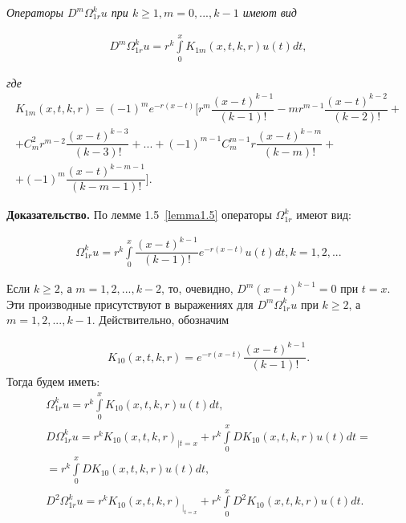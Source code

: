 \textit{Операторы $ D^m\Omega_{1r}^ku $ при $ k \geq 1, m = 0,...,k-1 $ имеют вид}

\begin{equation}
\begin{array}{c}

D^m\Omega_{1r}^ku = r^k\int\limits_0^x K_{1m}(x,t,k,r)u(t)dt,

\end{array}
\end{equation}

\textit{где}
\begin{equation}
\begin{array}{c}

K_{1m}(x,t,k,r) = (-1)^me^{-r(x-t)} \biggl[r^m\dfrac{(x-t)^{k-1}}{(k-1)!} - mr^{m-1}\dfrac{(x-t)^{k-2}}{(k-2)!} + \\ + C_m^2r^{m-2}\dfrac{(x-t)^{k-3}}{(k-3)!} + ... + (-1)^{m-1}C_m^{m-1}r\dfrac{(x-t)^{k-m}}{(k-m)!} + \\ 
+ (-1)^m\dfrac{(x-t)^{k-m-1}}{(k-m-1)!}\biggr].

\end{array}
\end{equation}

\textbf{Доказательство.} По лемме 1.5~\eqref{lemma1.5} операторы $ \Omega_{1r}^k $ имеют вид:

\begin{equation}
\begin{array}{c}
\nonumber

\Omega_{1r}^ku = r^k \int\limits_0^x \dfrac{(x-t)^{k-1}}{(k-1)!}e^{-r(x-t)}u(t)dt, k = 1,2,...

\end{array}
\end{equation}

Если $ k \geq 2 $, а $ m = 1,2,...,k-2 $, то, очевидно, $ D^m(x-t)^{k-1} = 0 $ при $ t = x $. Эти производные присутствуют в выражениях для $ D^m\Omega_{1r}^ku $ при $ k \geq 2 $, а $ m = 1,2,...,k-1 $. Действительно, обозначим

\begin{equation}
\begin{array}{c}

K_{10}(x,t,k,r) = e^{-r(x-t)}\dfrac{(x-t)^{k-1}}{(k-1)!}.

\end{array}
\end{equation}
Тогда будем иметь:
\begin{equation}
\begin{array}{c}
\nonumber

\Omega_{1r}^ku = r^k \int\limits_0^x K_{10}(x,t,k,r)u(t)dt, \\
D\Omega_{1r}^ku = r^kK_{10}(x,t,k,r)_{|t=x} + r^k\int\limits_0^x DK_{10}(x,t,k,r)u(t)dt = \\
= r^k\int\limits_0^x DK_{10}(x,t,k,r)u(t)dt, \\
D^2\Omega_{1r}^ku = r^kK_{10}(x,t,k,r)_{|_{t=x}} + r^k\int\limits_0^x D^2K_{10}(x,t,k,r)u(t)dt.

\end{array}
\end{equation}

